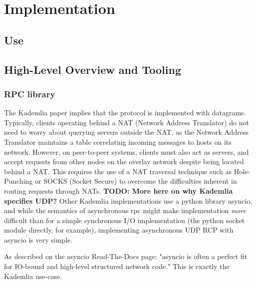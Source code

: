 \documentclass[12pt]{report}
\begin{document}
    \section{Implementation}
        \subsection{Use}
        \subsection{High-Level Overview and Tooling}
            \subsubsection{RPC library}
                The Kademlia paper implies that the protocol is implemented
                with datagrams\cite{kademlia}.  Typically, clients operating
                behind a NAT (Network Address Translator) do not need to worry
                about querying servers outside the NAT, as the Network Address
                Translator maintains a table correlating incoming messages to
                hosts on its network.  However, on peer-to-peer systems,
                clients must also act as servers, and accept requests from
                other nodes on the overlay network despite being located behind
                a NAT.  This requires the use of a NAT traversal technique such
                as Hole-Punching or SOCKS (Socket Secure) to overcome the
                difficulties inherent in routing requests through NATs.
                \textbf{TODO:
                More here on why Kademlia specifies UDP?}  Other Kademlia
                implementations use a python library asyncio, and while the
                semantics of asynchronous rpc might make implementation
                \textit{more} difficult than for a simple synchronous I/O
                implementation (the python socket module directly, for
                example), implementing asynchronous UDP RCP with asyncio is
                very simple.

                As described on the asyncio Read-The-Docs page: "asyncio is
                often a perfect fit for IO-bound and high-level structured
                network code." This is exactly the Kademlia use-case.
\end{document}
